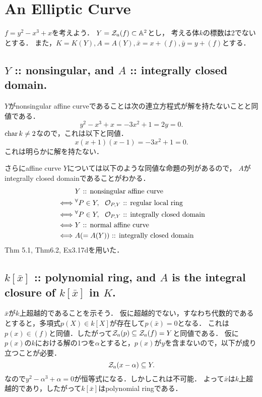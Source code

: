 \documentclass[a4paper]{jsarticle}
\begin{document}
\section{An Elliptic Curve} %
    $f=y^2-x^3+x$を考えよう．
    $Y=\mathcal{Z}_a(f) \subset \mathbb{A}^2$とし，
    考える体$k$の標数は2でないとする．
    また，$K=K(Y), A=A(Y), \bar{x}=x+(f), \bar{y}=y+(f)$とする．

    \subsection{$Y$ :: nonsingular, and $A$ :: integrally closed domain.}
    $Y$がnonsingular affine curveであることは次の連立方程式が解を持たないことと同値である．
    \[ y^2-x^3+x=-3x^2+1=2y=0. \]
    $\operatorname{char} k \neq 2$なので，これは以下と同値．
    \[ x(x+1)(x-1)=-3x^2+1=0. \]
    これは明らかに解を持たない．

    さらにaffine curve $Y$については以下のような同値な命題の列があるので，
    $A$がintegrally closed domainであることがわかる．
    \begin{align*}
        {}&     Y \text{ :: nonsingular affine curve} \\
        \iff&   {}^{\forall} P \in Y,~~ \mathcal{O}_{P,Y} \text{ :: regular local ring} \\
        \iff&   {}^{\forall} P \in Y,~~ \mathcal{O}_{P,Y} \text{ :: integrally closed domain} \\
        \iff&   Y \text{ :: normal affine curve} \\
        \iff&   A (=A(Y)) \text{ :: integrally closed domain}
    \end{align*}
    Thm 5.1, Thm6.2, Ex3.17dを用いた．
    
    \subsection{$k[\bar{x}]$ :: polynomial ring, and $A$ is the integral closure of $k[\bar{x}]$ in $K$.}
    $\bar{x}$が$k$上超越的であることを示そう．
    仮に超越的でない，すなわち代数的であるとすると，多項式$p(X) \in k[X]$が存在して$p(\bar{x})=0$となる．
    これは$p(x) \in (f)$と同値．したがって$\mathcal{Z}_a(p) \subseteq \mathcal{Z}_a(f)=Y$と同値である．
    仮に$p(x)$の$k$における解の1つを$\alpha$とすると，$p(x)$が$y$を含まないので，以下が成り立つことが必要．
    \[ \mathcal{Z}_a(x-\alpha) \subseteq Y. \]
    なので$y^2-\alpha^3+\alpha=0$が恒等式になる．しかしこれは不可能．
    よって$\bar{x}$は$k$上超越的であり，したがって$k[\bar{x}]$はpolynomial ringである．
\end{document}
